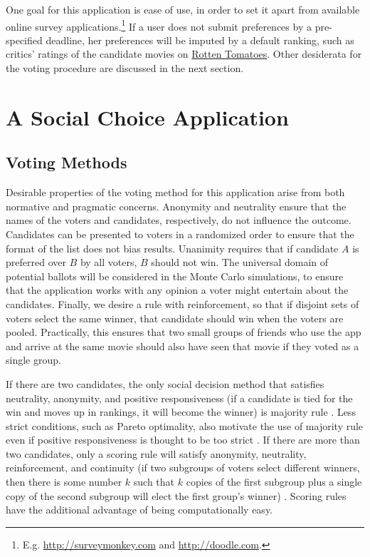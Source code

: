 \documentclass[12pt,letterpaper]{article} %
\begin{document}
One goal for this application is ease of use, in order to set it apart from available online survey applications.\footnote{E.g. \url{http://surveymonkey.com} and \url{http://doodle.com}.} If a user does not submit preferences by a pre-specified deadline, her preferences will be imputed by a default ranking, such as critics' ratings of the candidate movies on \href{http://rottentomatoes.com}{Rotten Tomatoes}. Other desiderata for the voting procedure are discussed in the next section.


\section{A Social Choice Application}



\subsection{Voting Methods}

Desirable properties of the voting method for this application arise from both normative and pragmatic concerns. Anonymity and neutrality ensure that the names of the voters and candidates, respectively, do not influence the outcome. Candidates can be presented to voters in a randomized order to ensure that the format of the list does not bias results. Unanimity requires that if candidate $A$ is preferred over $B$ by all voters, $B$ should not win. The universal domain of potential ballots will be considered in the Monte Carlo simulations, to ensure that the application works with any opinion a voter might entertain about the candidates. Finally, we desire a rule with reinforcement, so that if disjoint sets of voters select the same winner, that candidate should win when the voters are pooled. Practically, this ensures that two small groups of friends who use the app and arrive at the same movie should also have seen that movie if they voted as a single group.

If there are two candidates, the only social decision method that satisfies neutrality, anonymity, and positive responsiveness (if a candidate is tied for the win and moves up in rankings, it will become the winner) is majority rule \citep{may1952}. Less strict conditions, such as Pareto optimality, also motivate the use of majority rule even if positive responsiveness is thought to be too strict \citep{acsan2002,j2003majority}. If there are more than two candidates, only a scoring rule will satisfy anonymity, neutrality, reinforcement, and continuity (if two subgroups of voters select different winners, then there is some number $k$ such that $k$ copies of the first subgroup plus a single copy of the second subgroup will elect the first group's winner) \citep{young1975}. Scoring rules have the additional advantage of being computationally easy.
\end{document}

